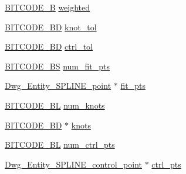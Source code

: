 \begin{DoxyCompactItemize}
\hyperlink{dwg_8h_ab533b1f62d9086749e3bb5b67e9f224e}{\-B\-I\-T\-C\-O\-D\-E\-\_\-\-B} \hyperlink{struct__dwg__entity__SPLINE_a2e6ef45af2fae230a8b2889ad6ca0c13}{weighted}
\item 
\hyperlink{dwg_8h_a3c1e6781466b74ba07785d57da70ed97}{\-B\-I\-T\-C\-O\-D\-E\-\_\-\-B\-D} \hyperlink{struct__dwg__entity__SPLINE_a5411e979dcdd75722ff741798a98d724}{knot\-\_\-tol}
\item 
\hyperlink{dwg_8h_a3c1e6781466b74ba07785d57da70ed97}{\-B\-I\-T\-C\-O\-D\-E\-\_\-\-B\-D} \hyperlink{struct__dwg__entity__SPLINE_adbf8c023b1bcf6de4da31cd718ecafb4}{ctrl\-\_\-tol}
\item 
\hyperlink{dwg_8h_a94297606fbd4a4ff97e8add284af0809}{\-B\-I\-T\-C\-O\-D\-E\-\_\-\-B\-S} \hyperlink{struct__dwg__entity__SPLINE_a2f99326c3e59d58870f3df8ddcc124a5}{num\-\_\-fit\-\_\-pts}
\item 
\hyperlink{dwg_8h_a21d2dc195a73bac9268ae38b556afc8f}{\-Dwg\-\_\-\-Entity\-\_\-\-S\-P\-L\-I\-N\-E\-\_\-point} $\ast$ \hyperlink{struct__dwg__entity__SPLINE_aefb5687567d1bbc372a077755ab9b29a}{fit\-\_\-pts}
\item 
\hyperlink{dwg_8h_aebd5f127038868cbabc3d55d91da776c}{\-B\-I\-T\-C\-O\-D\-E\-\_\-\-B\-L} \hyperlink{struct__dwg__entity__SPLINE_a82a0f35e298eb45dbd961667c9210497}{num\-\_\-knots}
\item 
\hyperlink{dwg_8h_a3c1e6781466b74ba07785d57da70ed97}{\-B\-I\-T\-C\-O\-D\-E\-\_\-\-B\-D} $\ast$ \hyperlink{struct__dwg__entity__SPLINE_aa0a70c97cbc777827fd2cbc26554efa0}{knots}
\item 
\hyperlink{dwg_8h_aebd5f127038868cbabc3d55d91da776c}{\-B\-I\-T\-C\-O\-D\-E\-\_\-\-B\-L} \hyperlink{struct__dwg__entity__SPLINE_a956472562d19af98b9f337c7ce237e2a}{num\-\_\-ctrl\-\_\-pts}
\item 
\hyperlink{dwg_8h_a4f567f74eb39cb823df06062dd4ebcfe}{\-Dwg\-\_\-\-Entity\-\_\-\-S\-P\-L\-I\-N\-E\-\_\-control\-\_\-point} $\ast$ \hyperlink{struct__dwg__entity__SPLINE_a93774145c24a2ff9512e2a9a03d6ac2a}{ctrl\-\_\-pts}
\end{DoxyCompactItemize}


